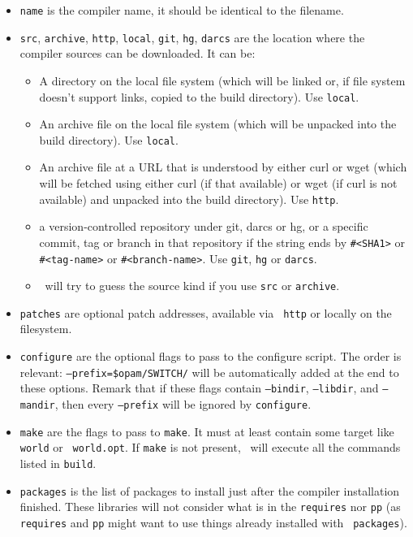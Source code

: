 \documentclass[a4paper,10pt]{article}
\begin{document}
\begin{itemize}

\item {\tt name} is the compiler name, it should be identical to the filename.
\item {\tt src}, {\tt archive}, {\tt http}, {\tt local}, {\tt git},
  {\tt hg}, {\tt darcs} are the location where the compiler sources
  can be downloaded. It can be:

\begin{itemize}
\item A directory on the local file system (which will be linked or,
  if file system doesn't support links, copied to the build
  directory). Use {\tt local}.
\item An archive file on the local file system (which will be unpacked
  into the build directory). Use {\tt local}.
\item An archive file at a URL that is understood by either curl or
  wget (which will be fetched using either curl (if that available) or
  wget (if curl is not available) and unpacked into the build
  directory). Use {\tt http}.
\item a version-controlled repository under git, darcs or
  hg, or a specific commit, tag or branch in that repository if
  the string ends by \verb+#<SHA1>+ or \verb+#<tag-name>+ or
  \verb+#<branch-name>+. Use {\tt git}, {\tt hg} or {\tt darcs}.
\item \OPAM\ will try to guess the source kind if you use {\tt src} or
  {\tt archive}.
\end{itemize}

\item {\tt patches} are optional patch addresses, available via {\tt
  http} or locally on the filesystem.

\item {\tt configure} are the optional flags to pass to the configure
  script. The order is relevant: {\tt --prefix=\$opam/SWITCH/} will be automatically
  added at the end to these options.
  Remark that if these flags contain {\tt --bindir}, {\tt --libdir},
  and {\tt --mandir}, then every {\tt --prefix} will be ignored by {\tt configure}.

\item {\tt make} are the flags to pass to {\tt make}.
  It must at least contain some target like {\tt world} or {\tt
    world.opt}. If {\tt make} is not present, \OPAM\ will execute all
  the commands listed in {\tt build}.

\item {\tt packages} is the list of packages to install just after the
  compiler installation finished. These libraries will not consider
  what is in the {\tt requires} nor {\tt pp} (as {\tt requires} and
  {\tt pp} might want to use things already installed with {\tt
    packages}).


\end{itemize}
\end{document}
